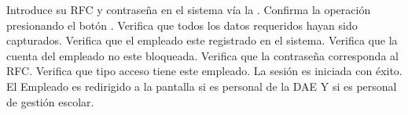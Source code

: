	\begin{UCtrayectoria}
	\UCpaso[\UCactor] Introduce su RFC y contraseña en el sistema vía la  \label{CU41.introduceDatos}.
	\UCpaso[\UCactor] Confirma la operación presionando el botón .
	\UCpaso Verifica que todos los datos requeridos hayan sido capturados.
	\UCpaso Verifica que el empleado este registrado en el sistema.
	\UCpaso Verifica que la cuenta del empleado no este bloqueada.
	\UCpaso Verifica que la contraseña corresponda al RFC.
	\UCpaso Verifica que tipo acceso tiene este empleado.
	\UCpaso La sesión es iniciada con éxito.
	\UCpaso El Empleado es redirigido a la pantalla  si es personal de la DAE Y  si es personal de gestión escolar.
	
\end{UCtrayectoria}






